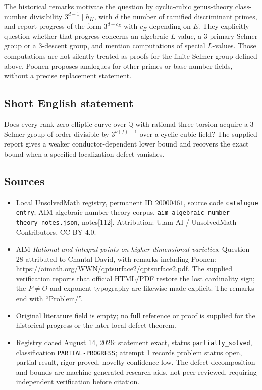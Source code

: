 \documentclass[11pt]{article}
\newcommand{\Q}{\mathbb{Q}}
\begin{document}
The historical remarks motivate the question by cyclic-cubic genus-theory class-number divisibility \(3^{d-1}\mid h_K\), with \(d\) the number of ramified discriminant primes, and report progress of the form \(3^{d-c_E}\) with \(c_E\) depending on \(E\). They explicitly question whether that progress concerns an algebraic \(L\)-value, a \(3\)-primary Selmer group or a \(3\)-descent group, and mention computations of special \(L\)-values. Those computations are not silently treated as proofs for the finite Selmer group defined above. Poonen proposes analogues for other primes or base number fields, without a precise replacement statement.
\subsection{Short English statement}
Does every rank-zero elliptic curve over \(\Q\) with rational three-torsion acquire a \(3\)-Selmer group of order divisible by \(3^{\nu(f)-1}\) over a cyclic cubic field? The supplied report gives a weaker conductor-dependent lower bound and recovers the exact bound when a specified localization defect vanishes.
\subsection{Sources}
\begin{itemize}
\item Local UnsolvedMath registry, permanent ID \(20000461\), source code \texttt{catalogue entry}; AIM algebraic number theory corpus, \texttt{aim-algebraic-number-theory-notes.json}, notes[112]. Attribution: Ulam AI / UnsolvedMath Contributors, CC BY 4.0.
\item AIM \emph{Rational and integral points on higher dimensional varieties}, Question 28 attributed to Chantal David, with remarks including Poonen: \url{https://aimath.org/WWN/qptsurface2/qptsurface2.pdf}. The supplied verification reports that official HTML/PDF restore the lost cardinality sign; the \(P\ne O\) and exponent typography are likewise made explicit. The remarks end with ``Problem/''.
\item Original literature field is empty; no full reference or proof is supplied for the historical progress or the later local-defect theorem.
\item Registry dated August 14, 2026: statement exact, status \texttt{partially\_solved}, classification \texttt{PARTIAL-PROGRESS}; attempt 1 records problem status open, partial result, rigor proved, novelty confidence low. The defect decomposition and bounds are machine-generated research aids, not peer reviewed, requiring independent verification before citation.
\end{itemize}
\end{document}
